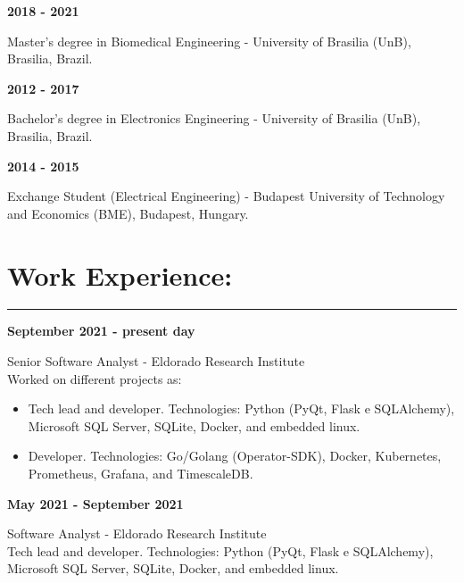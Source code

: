 \documentclass[11pt]{article}
\begin{document}
\textbf{2018 - 2021}
\begin{addmargin}{0.5cm}
Master's degree in Biomedical Engineering - University of Brasilia (UnB), Brasilia, Brazil. \\
\end{addmargin}

\textbf{2012 - 2017}
\begin{addmargin}{0.5cm}
Bachelor's degree in Electronics Engineering - University of Brasilia (UnB), Brasilia, Brazil. \\
\end{addmargin}

\textbf{2014 - 2015}
\begin{addmargin}{0.5cm}
Exchange Student (Electrical Engineering) - Budapest University of Technology and Economics (BME), Budapest, Hungary.
\end{addmargin}


\section{Work Experience:}
\hrule \vspace{0.1cm}

\textbf{September 2021 - present day}
\begin{addmargin}{0.5cm}
Senior Software Analyst - Eldorado Research Institute\\
Worked on different projects as:
\begin{itemize}
    \item Tech lead and developer. Technologies: Python (PyQt, Flask e SQLAlchemy), Microsoft SQL Server, SQLite, Docker, and embedded linux.
    \item Developer. Technologies: Go/Golang (Operator-SDK), Docker, Kubernetes, Prometheus, Grafana, and TimescaleDB. \\
\end{itemize}
\end{addmargin}

\textbf{May 2021 - September 2021}
\begin{addmargin}{0.5cm}
Software Analyst - Eldorado Research Institute \\
Tech lead and developer. Technologies: Python (PyQt, Flask e SQLAlchemy), Microsoft SQL Server, SQLite, Docker, and embedded linux.\\
\end{addmargin}
\end{document}
